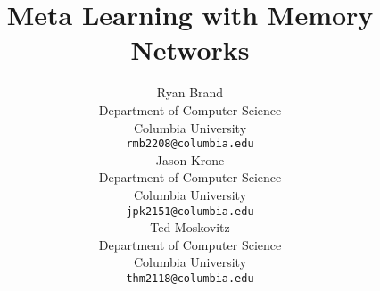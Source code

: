 \documentclass{article}
\title{Meta Learning with Memory Networks}
\author{
Ryan Brand \\
Department of Computer Science\\
Columbia University \\
\texttt{rmb2208@columbia.edu} \\
\And
Jason Krone \\
Department of Computer Science\\
Columbia University \\
\texttt{jpk2151@columbia.edu} \\
\And
Ted Moskovitz \\
Department of Computer Science\\
Columbia University \\
\texttt{thm2118@columbia.edu} \\
}
\begin{document}
\maketitle












\clearpage

\nocite{*}
\printbibliography
\end{document}
